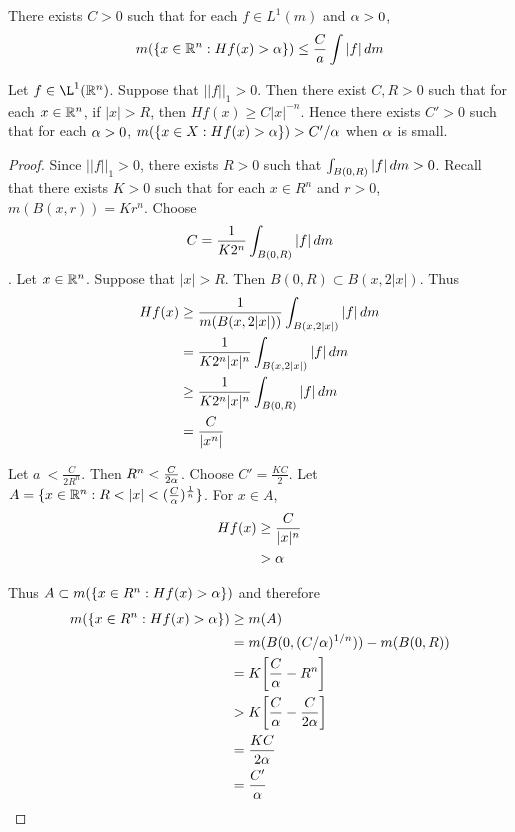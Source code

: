\documentclass{book}
\begin{document}
	\begin{thm}
		There exists $C >0$ such that for each $f \in L^1(m)$ and $\alpha > 0$, $$m(\{x \in \mathbb{R}^n: Hf(x) > \alpha\}) \leq \frac{C}{a} \int |f|\, d m$$
	\end{thm}
	
	\begin{ex}  
		Let $f \in \L^1(\R^n)$. Suppose that $||f||_1>0$. Then there exist $C,R>0$ such that for each $x \in \mathbb{R}^n$, if $|x| > R$, then $Hf(x) \geq C|x|^{-n}$. Hence there exists $C' > 0$ such that for each $\alpha >0$, $m(\{x \in X: Hf(x)>\alpha\}) > C'/\alpha$ when $\alpha$ is small. 
	\end{ex}
	
	\begin{proof}
		Since $||f||_1 >0$, there exists $R>0$ such that $\int_{B(0,R)}|f|\, d m >0$. Recall that there exists $K>0$ such that for each $x \in R^n$ and $r>0$, $m(B(x,r)) = Kr^n$. Choose $$C = \frac{1}{K2^n}\int_{B(0,R)}|f| \, d m$$. Let $x \in \mathbb{R}^n$. Suppose that $|x|>R$. Then $B(0,R) \subset B(x,2|x|)$. Thus 
		\begin{align*}
			Hf(x) 
			&\geq \frac{1}{m(B(x,2|x|))}\int_{B(x,2|x|)}|f|\, d m\\
			&= \frac{1}{K2^n|x|^n}\int_{B(x,2|x|)}|f|\, d m \\
			&\geq \frac{1}{K2^n|x|^n}\int_{B(0,R)}|f|\, d m \\
			&= \frac{C}{|x^n|}
		\end{align*}
		
		Let $a\ < \frac{C}{2R^n}$. Then $R^n < \frac{C}{2 \alpha}$. Choose $C' =\frac{KC}{2}$. Let $A = \{x \in \mathbb{R}^n: R < |x|< (\frac{C}{\alpha})^{\frac{1}{n}}\}$. For $x \in A$, 
		\begin{align*}
			Hf(x) 
			&\geq \frac{C}{|x|^n} \\
			& > \alpha
		\end{align*}
		
		Thus $A \subset m(\{x \in R^n: Hf(x)> \alpha\})$ and therefore 
		\begin{align*}
			m(\{x \in R^n: Hf(x)> \alpha\}) 
			&\geq m(A) \\
			&= m(B(0,(C/\alpha)^{1/n})) - m(B(0,R)) \\
			&= K\bigg [\frac{C}{\alpha} - R^n \bigg] \\
			&> K\bigg[\frac{C}{\alpha} - \frac{C}{2 \alpha}\bigg] \\
			&= \frac{KC}{2 \alpha}\\
			&= \frac{C'}{\alpha}
		\end{align*}
	\end{proof}
	
\end{document}
